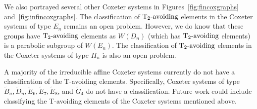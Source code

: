 We also portrayed several other Coxeter systems in Figures~\ref{fig:fincoxgraphs} and~\ref{fig:infincoxgraphs}. The classification of $\operatorname{T_2-\mathrm{avoiding}}$ elements in the Coxeter systems of type $E_n$ remains an open problem. However, we do know that these groups have $\operatorname{T_2-\mathrm{avoiding}}$ elements as $W(D_n)$ (which has $\operatorname{T_2-\mathrm{avoiding}}$ elements) is a parabolic subgroup of $W(E_n)$. The classification of $\operatorname{T_2-\mathrm{avoiding}}$ elements in the Coxeter systems of type $H_n$ is also an open problem. 

A majority of the irreducible affine Coxeter systems  currently do not have a classification of the T-avoiding elements. Specifically, Coxeter systems of type $\widetilde{B}_n, \widetilde{D}_n, \widetilde{E}_6, \widetilde{E}_7, \widetilde{E}_8$, and $\widetilde{G}_4$ do not have a classification. Future work could include classifying the T-avoiding elements of the Coxeter systems mentioned above.